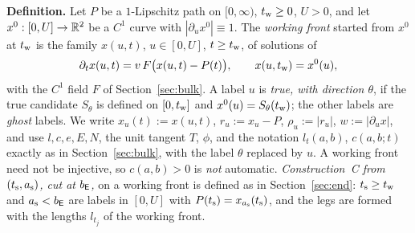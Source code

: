 \noindent\textbf{Definition.} Let $P$ be a $1$-Lipschitz path on $[0,\infty)$, $t_{\mathrm w}\ge0$, $U>0$, and let
$x^0:[0,U]\to\mathbb{R}^2$ be a $C^1$ curve with $|\partial_ux^0|\equiv1$. The \emph{working front} started from $x^0$ at $t_{\mathrm w}$ is the
family $x(u,t)$, $u\in[0,U]$, $t\ge t_{\mathrm w}$, of solutions of
\[
\partial_tx(u,t)=v\,F\bigl(x(u,t)-P(t)\bigr),\qquad x(u,t_{\mathrm w})=x^0(u),
\]
with the $C^1$ field $F$ of Section~\ref{sec:bulk}. A label $u$ is \emph{true, with direction $\theta$}, if the true candidate
$S_\theta$ is defined on $[0,t_{\mathrm w}]$ and $x^0(u)=S_\theta(t_{\mathrm w})$; the other labels are \emph{ghost} labels. We write $x_u(t):=x(u,t)$,
$r_u:=x_u-P$, $\rho_u:=|r_u|$, $w:=|\partial_ux|$, and use $l,c,e,E,N$, the unit tangent $T$, $\phi$, and the notation $l_t(a,b)$,
$c(a,b;t)$ exactly as in Section~\ref{sec:bulk}, with the label $\theta$ replaced by $u$. A working front need not be injective, so
$c(a,b)>0$ is \emph{not} automatic. \emph{Construction~C from $(t_{\mathrm s},a_{\mathrm s})$, cut at $b_{\mathsf E}$,} on a working front is defined
as in Section~\ref{sec:end}: $t_{\mathrm s}\ge t_{\mathrm w}$ and $a_{\mathrm s}<b_{\mathsf E}$ are labels in $[0,U]$ with $P(t_{\mathrm s})=x_{a_{\mathrm s}}(t_{\mathrm s})$, and
the legs are formed with the lengths $l_{t_j}$ of the working front.

